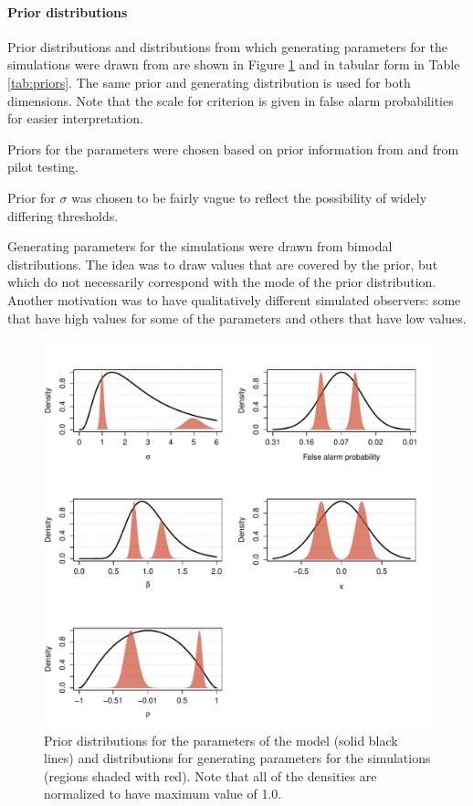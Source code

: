 \documentclass{article}\usepackage{knitr}
\begin{document}
\paragraph{Prior distributions}

Prior distributions and distributions from which generating parameters for the simulations were drawn from are shown in Figure \ref{fig:priors} and in tabular form in Table \ref{tab:priors}. The same prior and generating distribution is used for both dimensions. Note that the scale for criterion is given in false alarm probabilities for easier interpretation. 

Priors for the parameters were chosen based on prior information from \citet{silbert2009} and from pilot testing. 

Prior for $\sigma$ was chosen to be fairly vague to reflect the possibility of widely differing thresholds.

Generating parameters for the simulations were drawn from bimodal distributions. The idea was to draw values that are covered by the prior, but which do not necessarily correspond with the mode of the prior distribution. Another motivation was to have qualitatively different simulated observers: some that have high values for some of the parameters and others that have low values.

\begin{figure}[!htb]
\centering
\begin{knitrout}
\color{fgcolor}
\includegraphics[width=\maxwidth]{figure/unnamed-chunk-15-1} 

\end{knitrout}

\caption{Prior distributions for the parameters of the model (solid black lines) and distributions for generating parameters for the simulations (regions shaded with red). Note that all of the densities are normalized to have maximum value of 1.0.}
\label{fig:priors}
\end{figure}
\end{document}
